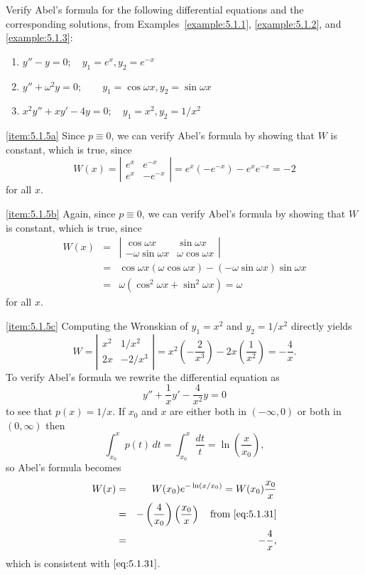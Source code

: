\documentclass{ximera}
\begin{document}
\begin{example}\label{example:5.1.5}
Verify Abel's formula for the following differential equations and the
corresponding solutions, from  Examples~\ref{example:5.1.1},
\ref{example:5.1.2}, and \ref{example:5.1.3}:
\begin{enumerate}
\item\label{item:5.1.5a} %
$y''-y=0;\quad  y_1=e^x,  y_2=e^{-x}$
\item\label{item:5.1.5b}%
$y''+\omega^2y=0;\quad \quad y_1=\cos\omega x, y_2=\sin\omega x$
\item\label{item:5.1.5c}%
$x^2y''+xy'-4y=0;\quad  y_1=x^2, y_2=1/x^2$
\end{enumerate}
\begin{explanation}
\ref{item:5.1.5a} Since $p\equiv0$, we can verify Abel's formula
by showing that $W$ is constant, which is true, since
$$
W(x)=\left| \begin{array}{rr}
e^x & e^{-x} \\
e^x & -e^{-x}
\end{array} \right|=e^x(-e^{-x})-e^xe^{-x}=-2
$$
for all $x$.
 
\ref{item:5.1.5b} Again, since $p\equiv0$, we can verify Abel's
formula
by showing that $W$ is constant, which is true, since
\begin{eqnarray*}
W(x)&=&\left| \begin{array}{cc}
\cos\omega x & \sin\omega x \\
-\omega\sin\omega x &\omega\cos\omega x
\end{array} \right|\\
&=&\cos\omega x (\omega\cos\omega x)-(-\omega\sin\omega x)\sin\omega
x\\ &=&\omega(\cos^2\omega x+\sin^2\omega x)=\omega
\end{eqnarray*}
for all $x$.
 
\ref{item:5.1.5c}
Computing the Wronskian of $y_1=x^2$ and
$y_2=1/x^2$ directly yields
\begin{equation}\label{eq:5.1.31}
W=\left| \begin{array}{cc}
x^2 & 1/x^2 \\
2x & -2/x^3
\end{array} \right|=x^2\left(-\frac{2}{x^3}\right)-2x\left(\frac{1}{x^2}\right)
=-\frac{4}{x}.
\end{equation}
To verify Abel's formula we
rewrite the differential  equation as
$$
y''+\frac{1}{x}y'-\frac{4}{x^2}y=0
$$
to see  that $p(x)=1/x$. If $x_0$ and $x$ are either both in
$(-\infty,0)$ or both in $(0,\infty)$ then
$$
\int_{x_0}^x p(t)\,dt=\int_{x_0}^x \frac{dt}{t}=\ln\left(\frac{x}{x_0}
\right),
$$
so Abel's formula becomes
\begin{eqnarray*}
W(x)&=&W(x_0)e^{-\ln(x/x_0)}=W(x_0)\frac{x_0}{x}\\
&=&-\left(\frac{4}{x_0}\right)\left(\frac{x_0}{x}\right)\quad\mbox{from
$\eqref{eq:5.1.31}$}\\
&=&-\frac{4}{x},
\end{eqnarray*}
which is consistent with $\eqref{eq:5.1.31}$.
\end{explanation}
\end{example}
 
\end{document}
